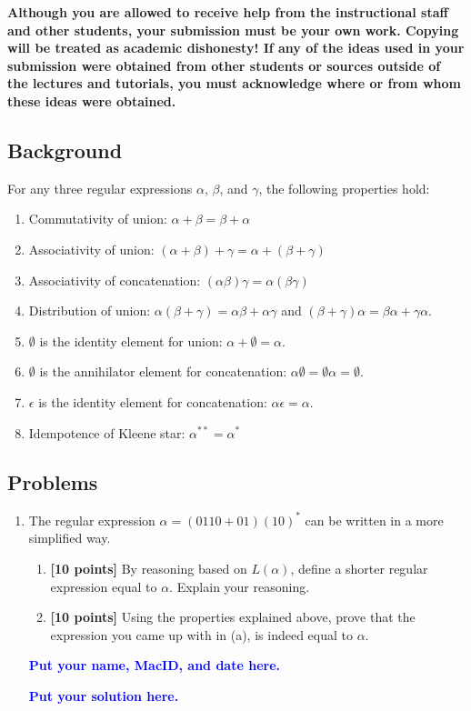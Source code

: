 \documentclass[11pt,fleqn]{article}
\newcommand{\be}{\begin{enumerate}}
\newcommand{\ee}{\end{enumerate}}
\begin{document}
	\textbf{Although you are allowed to receive help from the
		instructional staff and other students, your submission must be your
		own work.  Copying will be treated as academic dishonesty! If any of
		the ideas used in your submission were obtained from other students
		or sources outside of the lectures and tutorials, you must
		acknowledge where or from whom these ideas were obtained.}
	
	\newpage
	
	\subsection*{Background}
	For any three regular expressions $\alpha$, $\beta$, and $\gamma$, the following properties hold:
	\be
	\item Commutativity of union: $ \alpha + \beta  = \beta + \alpha$
	\item Associativity of union: $ (\alpha + \beta) + \gamma = \alpha + (\beta + \gamma)$
	\item Associativity of concatenation: $(\alpha \beta) \gamma = \alpha (\beta  \gamma)$
	\item Distribution of union: $ \alpha (\beta + \gamma) = \alpha \beta + \alpha  \gamma$ and $  (\beta + \gamma)\alpha =  \beta \alpha +   \gamma \alpha$.
	\item $\emptyset$ is the identity element for union: $\alpha + \emptyset = \alpha$.
	\item $\emptyset$ is the annihilator element for concatenation: $\alpha  \emptyset = \emptyset \alpha = \emptyset$.
	\item $\epsilon$ is the identity element for concatenation: $\alpha  \epsilon = \alpha$.
	\item Idempotence of Kleene star: $\alpha^{**} = \alpha^*$
	\ee
	
	\subsection*{Problems}
	
	\be
	
	\item The regular expression $\alpha = (0110 + 01) (10)^*$ can be written in a more simplified way. 
	\be
	\item \textbf{[10 points]} By reasoning based on $L(\alpha)$, define a shorter regular expression equal to $\alpha$. Explain your reasoning.
	\item \textbf{[10 points]} Using the properties explained above, prove that the expression you came up with in (a), is indeed equal to $\alpha$.
	\ee
	
	\bigskip
	
	\textcolor{blue}{\textbf{Put your name, MacID, and date here.}}

        \medskip

        \noindent
        \textcolor{blue}{\textbf{Put your solution here.}}

\ee
\end{document}
